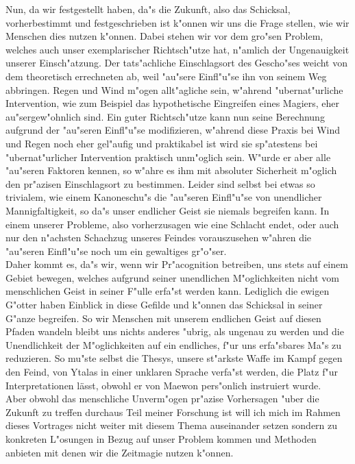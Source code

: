 \documentclass[a5paper,8pt]{book}
\begin{document}
Nun, da wir festgestellt haben, da"s die Zukunft, also das Schicksal, vorherbestimmt und festgeschrieben ist k"onnen wir uns die Frage stellen, wie wir Menschen dies nutzen 
k"onnen.
Dabei stehen wir vor dem gro"sen Problem, welches auch unser exemplarischer Richtsch"utze hat, n"amlich der Ungenauigkeit unserer Einsch"atzung. Der tats"achliche Einschlagsort 
des Gescho"ses weicht von dem theoretisch errechneten ab, weil "au"sere Einfl"u"se ihn von seinem Weg abbringen. Regen und Wind m"ogen allt"agliche sein, w"ahrend 
"ubernat"urliche Intervention, wie zum Beispiel das hypothetische Eingreifen eines Magiers, eher au"sergew"ohnlich sind.
Ein guter Richtsch"utze kann nun seine Berechnung aufgrund der "au"seren Einfl"u"se modifizieren, w"ahrend diese Praxis bei Wind und Regen noch eher gel"aufig und praktikabel 
ist wird sie sp"atestens bei "ubernat"urlicher Intervention praktisch unm"oglich sein. W"urde er aber alle "au"seren Faktoren kennen, so w"ahre es ihm mit absoluter Sicherheit 
m"oglich den pr"azisen Einschlagsort zu bestimmen. Leider sind selbst bei etwas so trivialem, wie einem Kanoneschu"s die "au"seren Einfl"u"se von unendlicher Mannigfaltigkeit, 
so da"s unser endlicher Geist sie niemals begreifen kann.
In einem unserer Probleme, also vorherzusagen wie eine Schlacht endet, oder auch nur den n"achsten Schachzug unseres Feindes vorauszusehen w"ahren die "au"seren Einfl"u"se 
noch um ein gewaltiges gr"o"ser.\\

Daher kommt es, da"s wir, wenn wir Pr"acognition betreiben, uns stets auf einem Gebiet bewegen, welches aufgrund seiner unendlichen M"oglichkeiten nicht vom menschlichen Geist 
in seiner F"ulle erfa"st werden kann. Lediglich die ewigen G"otter haben Einblick in diese Gefilde und k"onnen das Schicksal in seiner G"anze begreifen.
So wir Menschen mit unserem endlichen Geist auf diesen Pfaden wandeln bleibt uns nichts anderes "ubrig, als ungenau zu werden und die Unendlichkeit der M"oglichkeiten auf ein 
endliches, f"ur uns erfa"sbares Ma"s zu reduzieren.
So mu"ste selbst die Thesys, unsere st"arkste Waffe im Kampf gegen den Feind, von Ytalas in einer unklaren Sprache verfa"st werden, die Platz f"ur Interpretationen lässt, 
obwohl er von Maewon pers"onlich instruiert wurde.\\

Aber obwohl das menschliche Unverm"ogen pr"azise Vorhersagen "uber die Zukunft zu treffen durchaus Teil meiner Forschung ist will ich mich im Rahmen dieses Vortrages nicht 
weiter mit diesem Thema auseinander setzen sondern zu konkreten L"osungen in Bezug auf unser Problem kommen und Methoden anbieten mit denen wir die Zeitmagie nutzen k"onnen.\\
\end{document}
